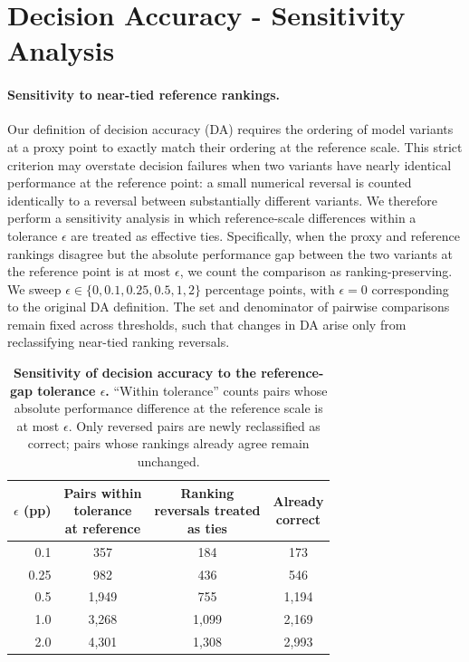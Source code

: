 \clearpage

\section{Decision Accuracy - Sensitivity Analysis}
\label{app:da-sensitivity}

\paragraph{Sensitivity to near-tied reference rankings.}
Our definition of decision accuracy (DA) requires the ordering of model variants at a proxy point to exactly match their ordering at the reference scale. This strict criterion may overstate decision failures when two variants have nearly identical performance at the reference point: a small numerical reversal is counted identically to a reversal between substantially different variants. We therefore perform a sensitivity analysis in which reference-scale differences within a tolerance $\epsilon$ are treated as effective ties. Specifically, when the proxy and reference rankings disagree but the absolute performance gap between the two variants at the reference point is at most $\epsilon$, we count the comparison as ranking-preserving. We sweep $\epsilon \in \{0, 0.1, 0.25, 0.5, 1, 2\}$ percentage points, with $\epsilon=0$ corresponding to the original DA definition. The set and denominator of pairwise comparisons remain fixed across thresholds, such that changes in DA arise only from reclassifying near-tied ranking reversals.

\begin{table}[ht]
\centering

\label{tab:da_tolerance}
\begin{tabular}{rccc}
\toprule
$\epsilon$ (pp) &
\shortstack{Pairs within\\ tolerance\\at reference} &
\shortstack{Ranking \\ reversals treated \\ as ties} &
\shortstack{Already\\correct} \\
\midrule
0.1  & 357   & 184   & 173   \\
0.25 & 982   & 436   & 546   \\
0.5  & 1,949 & 755   & 1,194 \\
1.0  & 3,268 & 1,099 & 2,169 \\
2.0  & 4,301 & 1,308 & 2,993 \\
\bottomrule
\end{tabular}
\caption{
\textbf{Sensitivity of decision accuracy to the reference-gap tolerance $\epsilon$.}
``Within tolerance'' counts pairs whose absolute performance difference at the reference scale is at most $\epsilon$.
Only reversed pairs are newly reclassified as correct; pairs whose rankings already agree remain unchanged.
}
\end{table}

